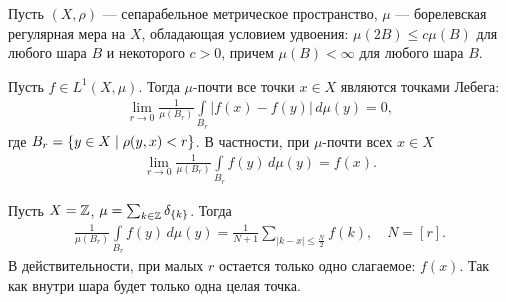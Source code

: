 
\begin{thm}[%
]
\label{theorem:almost_all_points_are_lebesgue_points}
 Пусть $(X, \rho)$ --- сепарабельное метрическое пространство, $\mu$ --- борелевская регулярная мера на $X$, обладающая условием удвоения: $\mu(2B) \leqslant c \mu(B)$  для любого шара $B$  и некоторого $c > 0$, причем $\mu(B) < \infty$  для любого шара $B$.

 Пусть $f \in L^{1}(X,\mu)$. Тогда $\mu$-почти все точки $x \in X$ являются точками Лебега: \begin{align}
  \label{equation:theorem_almost_all_points_are_lebesgue_points_1}
  \lim_{r \to 0} \frac{1}{\mu(B_r)} \int\limits_{B_r} \left| f(x) - f(y) \right| \, d\mu(y) = 0
 ,\end{align} где $B_r = \left\{ y \in X \;\middle|\; \rho(y, x) < r \right\}$. В частности, при $\mu$-почти всех $x \in X$  \begin{align}
  \label{equation:theorem_almost_all_points_are_lebesgue_points_2}
 \lim\limits_{r \to 0} \frac{1}{\mu(B_r)} \int\limits_{B_r} f(y) \, d\mu  (y) = f(x)
 .\end{align} 
\end{thm}
\begin{remrk}
 Пусть $X = \mathbb{Z}$, $\mu = \sum_{k \in \mathbb{Z}} \delta_{\left\{ k \right\}}$. Тогда \begin{align*}
  \frac{1}{\mu(B_r)} \int\limits_{B_r} f(y) \, d\mu  (y) = \frac{1}{N + 1} \sum_{\left| k - x \right| \leqslant \frac{N}{2}} f(k), \quad N = [r]
 .\end{align*} В действительности, при малых $r$ остается только одно слагаемое: $f(x)$. Так как внутри шара будет только одна целая точка.
\end{remrk}


